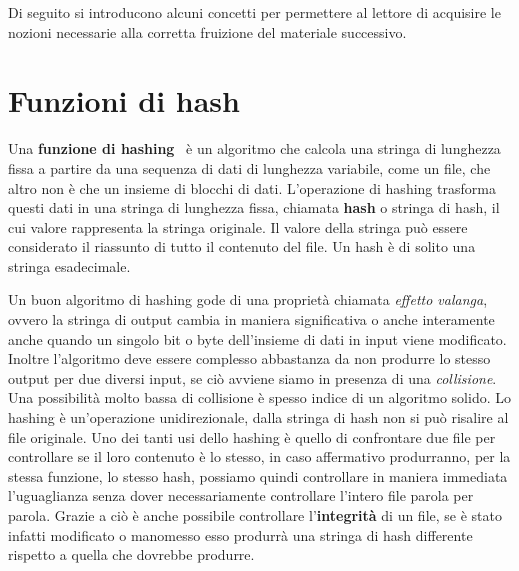 Di seguito si introducono alcuni concetti 
per permettere al lettore di acquisire le nozioni necessarie alla
corretta fruizione del materiale successivo.

\section{Funzioni di hash}
\label{sub:hash}
Una \textbf{funzione di hashing}~\cite{hash} è un algoritmo che calcola una stringa di lunghezza
fissa a partire da una sequenza di dati di lunghezza variabile, come un file,
che altro non è che un insieme di blocchi di dati.
L’operazione di hashing trasforma questi dati in una stringa di lunghezza fissa, chiamata \textbf{hash} o stringa di hash,
il cui valore rappresenta la stringa originale. Il valore della stringa può essere considerato
il riassunto di tutto il contenuto del file. Un hash è di solito una stringa esadecimale.

Un buon algoritmo di hashing gode di una proprietà chiamata \emph{effetto valanga},
ovvero la stringa di output cambia in maniera significativa o anche interamente anche
quando un singolo bit o byte dell’insieme di dati in input viene modificato. Inoltre l’algoritmo deve essere
complesso abbastanza da non produrre lo stesso output per due diversi input, se ciò avviene
siamo in presenza di una \emph{collisione}. Una possibilità molto bassa di collisione è spesso
indice di un algoritmo solido. Lo hashing è un’operazione unidirezionale, dalla stringa di hash
non si può risalire al file originale.
Uno dei tanti usi dello hashing è quello di confrontare due file per controllare se il loro contenuto
è lo stesso, in caso affermativo produrranno, per la stessa funzione, lo stesso hash,
possiamo quindi controllare in maniera immediata l’uguaglianza senza dover necessariamente
controllare l’intero file parola per parola.
Grazie a ciò è anche possibile controllare l’\textbf{integrità} di un file, se è stato infatti
modificato o manomesso esso produrrà una stringa di hash differente rispetto a quella che dovrebbe produrre.

